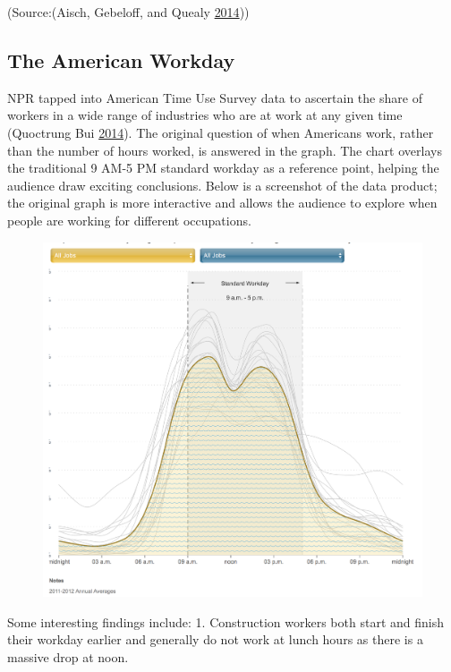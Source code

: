 \documentclass[]{book}
\theoremstyle{definition}
\theoremstyle{definition}
\theoremstyle{definition}
\theoremstyle{remark}
\begin{document}
(Source:(Aisch, Gebeloff, and Quealy
\protect\hyperlink{ref-migration}{2014}))

\subsection{The American Workday}\label{the-american-workday}

NPR tapped into American Time Use Survey data to ascertain the share of
workers in a wide range of industries who are at work at any given time
(Quoctrung Bui \protect\hyperlink{ref-NPR_workday}{2014}). The original
question of when Americans work, rather than the number of hours worked,
is answered in the graph. The chart overlays the traditional 9 AM-5 PM
standard workday as a reference point, helping the audience draw
exciting conclusions. Below is a screenshot of the data product; the
original graph is more interactive and allows the audience to explore
when people are working for different occupations.

\begin{figure}
\centering
\includegraphics{images/npr_workday.png}
\caption{}
\end{figure}

Some interesting findings include: 1. Construction workers both start
and finish their workday earlier and generally do not work at lunch
hours as there is a massive drop at noon.
\end{document}
